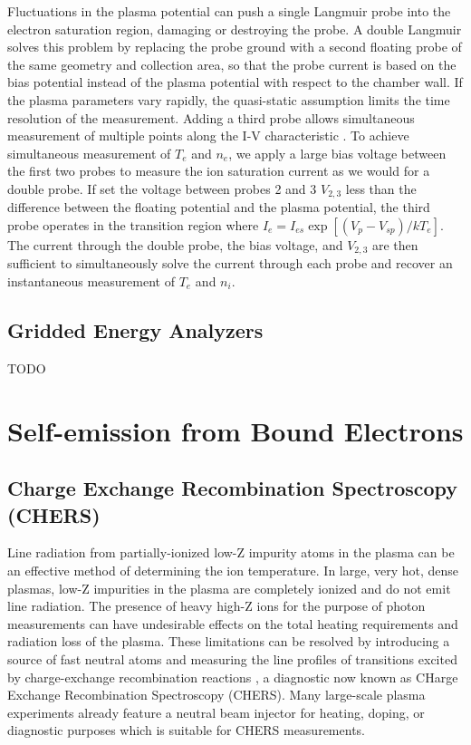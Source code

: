 \documentclass{jpp}
\begin{document}
Fluctuations in the plasma potential can push a single Langmuir probe into the electron saturation region, damaging or destroying the probe. A double Langmuir solves this problem by replacing the probe ground with a second floating probe of the same geometry and collection area, so that the probe current is based on the bias potential instead of the plasma potential with respect to the chamber wall. If the plasma parameters vary rapidly, the quasi-static assumption limits the time resolution of the measurement. Adding a third probe allows simultaneous measurement of multiple points along the I-V characteristic \citep{doi:10.1063/1.1714492}. To achieve simultaneous measurement of $T_e$ and $n_e$, we apply a large bias voltage between the first two probes to measure the ion saturation current as we would for a double probe. If set the voltage between probes 2 and 3 $V_{2,3}$ less than the difference between the floating potential and the plasma potential, the third probe operates in the transition region where $I_e = I_{es} \exp [(V_p - V_{sp})/ k T_e]$. The current through the double probe, the bias voltage, and $V_{2, 3}$ are then sufficient to simultaneously solve the current through each probe and recover an instantaneous measurement of $T_e$ and $n_i$.


\subsection{Gridded Energy Analyzers}

{\Large TODO \par}

\section{Self-emission from Bound Electrons}


\subsection{Charge Exchange Recombination Spectroscopy (CHERS)}

Line radiation from partially-ionized low-Z impurity atoms in the plasma can be an effective method of determining the ion temperature. In large, very hot, dense plasmas, low-Z impurities in the plasma are completely ionized and do not emit line radiation. The presence of heavy high-Z ions for the purpose of photon measurements can have undesirable effects on the total heating requirements and radiation loss of the plasma. These limitations can be resolved by introducing a source of fast neutral atoms and measuring the line profiles of transitions excited by charge-exchange recombination reactions \citep{doi:10.1063/1.93893}, a diagnostic now known as CHarge Exchange Recombination Spectroscopy (CHERS). Many large-scale plasma experiments already feature a neutral beam injector for heating, doping, or diagnostic purposes which is suitable for CHERS measurements.
\end{document}
